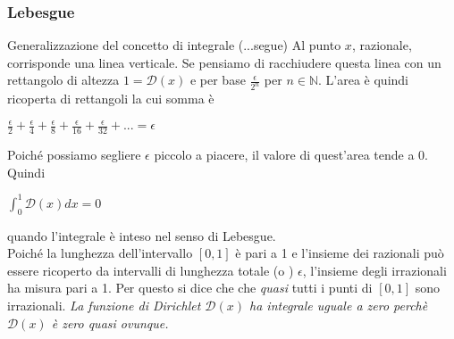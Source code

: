 \begin{frame}
  \frametitle{Lebesgue}
    \begin{block}{Generalizzazione del concetto di integrale (...segue)}
    Al punto $x$, razionale, corrisponde una linea verticale. Se pensiamo di racchiudere questa linea con un rettangolo di altezza $1=\mathcal{D} (x)$ 
    e per base $\frac{\epsilon}{2^n}$ per $n \in \mathbb{N} $. L'area è quindi ricoperta di rettangoli la cui somma è
    \begin{center}
      $\frac{\epsilon}{2}+\frac{\epsilon}{4}+\frac{\epsilon}{8}+\frac{\epsilon}{16}+\frac{\epsilon}{32}+... = \epsilon$
    \end{center}     
    Poiché possiamo segliere $\epsilon$ piccolo a piacere, il valore di quest'area tende a 0. Quindi 
    \begin{center}
      $\int^1_0 \mathcal{D} (x) dx = 0$
    \end{center} 
    quando l'integrale è inteso nel senso di Lebesgue. \\
    Poiché la lunghezza dell'intervallo $[0,1]$ è pari a 1 e l'insieme dei razionali 
    può essere ricoperto da intervalli di lunghezza totale (o ) $\epsilon$, 
    l'insieme degli irrazionali ha misura pari a 1. Per questo si dice che che \textit{quasi} tutti i punti di $[0,1]$
    sono irrazionali. \textit{La funzione di Dirichlet $\mathcal{D} (x)$ ha integrale uguale a zero perchè  $\mathcal{D} (x)$ 
    è zero quasi ovunque.}  
  \end{block}
\end{frame}


